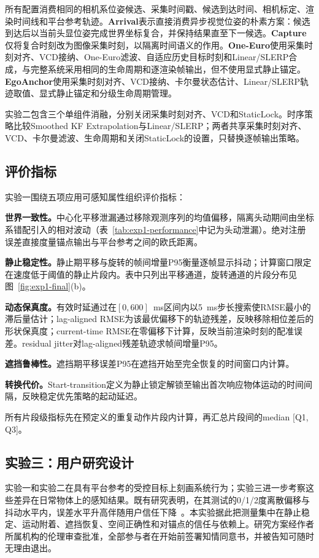 \documentclass[review]{vgtc}
\begin{document}
所有配置消费相同的相机系位姿候选、采集时间戳、候选到达时间、相机标定、渲染时间线和平台参考轨迹。\textbf{Arrival}表示直接消费异步视觉位姿的朴素方案：候选到达后以当前头显位姿完成世界坐标复合，并保持结果直至下一候选。\textbf{Capture}仅将复合时刻改为图像采集时刻，以隔离时间语义的作用。\textbf{One-Euro}使用采集时刻对齐、VCD接纳、One-Euro滤波、自适应历史目标时刻和Linear/SLERP合成，与完整系统采用相同的生命周期和逐渲染帧输出，但不使用显式静止锚定。\textbf{EgoAnchor}使用采集时刻对齐、VCD接纳、卡尔曼状态估计、Linear/SLERP轨迹取值、显式静止锚定和分级生命周期管理。

实验二包含三个单组件消融，分别关闭采集时刻对齐、VCD和StaticLock。时序策略比较Smoothed KF Extrapolation与Linear/SLERP；两者共享采集时刻对齐、VCD、卡尔曼滤波、生命周期和关闭StaticLock的设置，只替换逐帧输出策略。

\subsection{评价指标}

实验一围绕五项应用可感知属性组织评价指标：

\textbf{世界一致性。}中心化平移泄漏通过移除观测序列的均值偏移，隔离头动期间由坐标系错配引入的相对波动（表~\ref{tab:exp1-performance}中记为头动泄漏）。绝对注册误差直接度量锚点输出与平台参考之间的欧氏距离。

\textbf{静止稳定性。}静止期平移与旋转的帧间增量P95衡量逐帧显示抖动；计算窗口限定在速度低于阈值的静止片段内。表中只列出平移通道，旋转通道的片段分布见图~\ref{fig:exp1-final}(b)。

\textbf{动态保真度。}有效时延通过在$[0, 600]$~ms区间内以5~ms步长搜索使RMSE最小的滞后量估计；lag-aligned RMSE为该最优偏移下的轨迹残差，反映移除相位差后的形状保真度；current-time RMSE在零偏移下计算，反映当前渲染时刻的配准误差。residual jitter对lag-aligned残差轨迹求帧间增量P95。

\textbf{遮挡鲁棒性。}遮挡期平移误差P95在遮挡开始至完全恢复的时间窗口内计算。

\textbf{转换代价。}Start-transition定义为静止锁定解锁至输出首次响应物体运动的时间间隔，反映稳定优先策略的起动延迟。

所有片段级指标先在预定义的重复动作片段内计算，再汇总片段间的median [Q1, Q3]。

\subsection{实验三：用户研究设计}\label{sec:exp3-design}

实验一和实验二在具有平台参考的受控目标上刻画系统行为；实验三进一步考察这些差异在日常物体上的感知结果。既有研究表明，在其测试的0/1/2度离散偏移与抖动水平内，误差水平升高伴随用户信任下降~\cite{gottsacker2024artrust}。本实验据此把测量集中在静止稳定、运动附着、遮挡恢复、空间正确性和对锚点的信任与依赖上。研究方案经作者所属机构的伦理审查批准，全部参与者在开始前签署知情同意书，并被告知可随时无理由退出。
\end{document}
